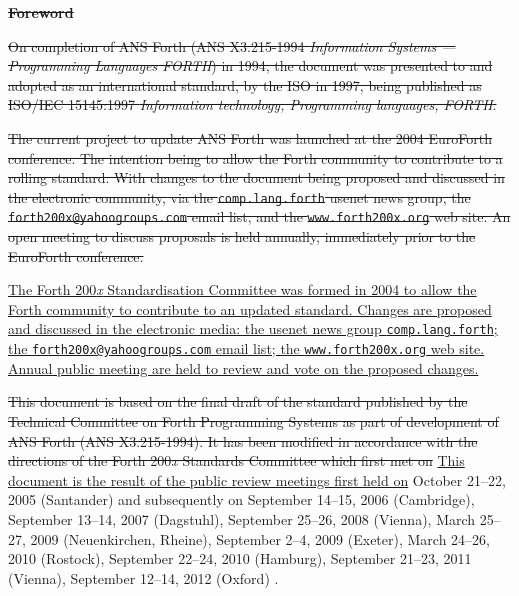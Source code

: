 
\textbf{\textsf{\LARGE \sout{Foreword}}}\cbstart{}
\label{foreword}

\sout{%
On completion of ANS Forth (ANS X3.215-1994 \emph{Information Systems
--- Programming Languages FORTH}) in 1994, the document was presented
to and adopted as an international standard, by the ISO in 1997, being
published as ISO/IEC 15145:1997 \emph{Information technology,
Programming languages, FORTH}.}

\sout{The current project to update ANS Forth was launched at the 2004
EuroForth conference.  The intention being to allow the Forth community
to contribute to a rolling standard.  With changes to the document
being proposed and discussed in the electronic community, via the
\texttt{comp.lang.forth} usenet news group, the
\texttt{forth200x@yahoogroups.com} email list,
and the \texttt{www.forth200x.org} web site.  An open meeting to
discuss proposals is held annually, immediately prior to the EuroForth
conference.}

\uline{%
The Forth 200\emph{x} Standardisation Committee was formed in 2004
to allow the Forth community to contribute to an updated standard. Changes
are proposed and discussed in the electronic media:
the usenet news group \texttt{comp.lang.forth};
the \texttt{forth200x@yahoogroups.com} email list;
the \texttt{www.forth200x.org} web site.
Annual public meeting are held to review and vote on the proposed
changes.}

\sout{%
This document is based on the final draft of the standard published
by the Technical Committee on Forth Programming Systems as part of
development of ANS Forth (ANS X3.215-1994).
%
It has been modified in accordance with
the directions of the Forth 200\emph{x} Standards Committee which first
met on}
\uline{%
This document is the result of the public review meetings first held on}
\cbend
October 21--22, 2005 (Santander) and subsequently on
September 14--15, 2006 (Cambridge),
September 13--14, 2007 (Dagstuhl),
September 25--26, 2008 (Vienna),
March 25--27, 2009 (Neuenkirchen, Rheine),
September 2--4, 2009 (Exeter),
March 24--26, 2010 (Rostock),
September 22--24, 2010 (Hamburg),
September 21--23, 2011 (Vienna),
September 12--14, 2012 (Oxford)%
.
